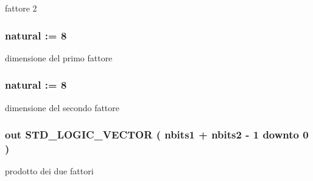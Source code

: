fattore 2 

\hypertarget{group___multiplier_ga4ede473cdc13e75fe66fbd548b62e432}{
\subsubsection[{nbits1}]{ {\bfseries \textcolor{vhdlchar}{ }} {\bfseries \textcolor{vhdlchar}{natural}\textcolor{vhdlchar}{ }\textcolor{vhdlchar}{ }\textcolor{vhdlchar}{\+:}\textcolor{vhdlchar}{=}\textcolor{vhdlchar}{ }\textcolor{vhdlchar}{ } \textcolor{vhdldigit}{8} \textcolor{vhdlchar}{ }} \hspace{0.3cm}{\ttfamily [Generic]}}}\label{group___multiplier_ga4ede473cdc13e75fe66fbd548b62e432}


dimensione del primo fattore 

\hypertarget{group___multiplier_ga8b5bdaff4c3669528aaec95a07e17c2a}{
\subsubsection[{nbits2}]{ {\bfseries \textcolor{vhdlchar}{ }} {\bfseries \textcolor{vhdlchar}{natural}\textcolor{vhdlchar}{ }\textcolor{vhdlchar}{ }\textcolor{vhdlchar}{\+:}\textcolor{vhdlchar}{=}\textcolor{vhdlchar}{ }\textcolor{vhdlchar}{ } \textcolor{vhdldigit}{8} \textcolor{vhdlchar}{ }} \hspace{0.3cm}{\ttfamily [Generic]}}}\label{group___multiplier_ga8b5bdaff4c3669528aaec95a07e17c2a}


dimensione del secondo fattore 

\hypertarget{group___multiplier_gaf168dc69ad77dc5791b5e0f99dcfb0a9}{
\subsubsection[{prod}]{ {\bfseries \textcolor{vhdlchar}{out}\textcolor{vhdlchar}{ }} {\bfseries \textcolor{vhdlchar}{S\+T\+D\+\_\+\+L\+O\+G\+I\+C\+\_\+\+V\+E\+C\+T\+O\+R}\textcolor{vhdlchar}{ }\textcolor{vhdlchar}{(}\textcolor{vhdlchar}{ }\textcolor{vhdlchar}{ }\textcolor{vhdlchar}{ }\textcolor{vhdlchar}{ }{\bfseries {\bf nbits1}} \textcolor{vhdlchar}{+}\textcolor{vhdlchar}{ }\textcolor{vhdlchar}{ }\textcolor{vhdlchar}{ }{\bfseries {\bf nbits2}} \textcolor{vhdlchar}{-\/}\textcolor{vhdlchar}{ } \textcolor{vhdldigit}{1} \textcolor{vhdlchar}{ }\textcolor{vhdlchar}{downto}\textcolor{vhdlchar}{ }\textcolor{vhdlchar}{ } \textcolor{vhdldigit}{0} \textcolor{vhdlchar}{ }\textcolor{vhdlchar}{)}\textcolor{vhdlchar}{ }} \hspace{0.3cm}{\ttfamily [Port]}}}\label{group___multiplier_gaf168dc69ad77dc5791b5e0f99dcfb0a9}


prodotto dei due fattori 

